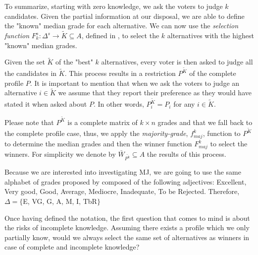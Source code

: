 \documentclass[version=3.21, pagesize, twoside=off, bibliography=totoc, DIV=calc, fontsize=12pt, a4paper]{scrartcl}
\begin{document}
To summarize, starting with zero knowledge, we ask the voters to judge $k$ candidates. Given the partial information at our disposal, we are able to define the "known" median grade for each alternative. We can now use the \emph{selection function} $F^s_k:\Delta^s \rightarrow \tilde{K} \subseteq A$, defined in , to select the $k$ alternatives with the highest "known" median grades.

Given the set $\tilde{K}$ of the "best" $k$ alternatives, every voter is then asked to judge all the candidates in $\tilde{K}$. 
This process results in a restriction $P^{\tilde{K}}$ of the complete profile $P$. It is important to mention that when we ask the voters to judge an alternative $i\in \tilde{K}$ we assume that they report their preference as they would have stated it when asked about $P$. In other words, $P^{\tilde{K}}_{i} = P_i$ for any $i \in \tilde{K}$.

Please note that $P^{\tilde{K}}$ is a complete matrix of $k \times n$ grades and that we fall back to the complete profile case, thus, we apply the \emph{majority-grade}, $f^k_{maj}$, function to $P^{\tilde{K}}$ to determine the median grades and then the winner function $F^k_{maj}$ to select the winners. For simplicity we denote by $\bar{W}_{\bar{P^k}} \subseteq A$ the results of this process.

\begin{remark}
	Because we are interested into investigating \acs{MJ}, we are going to use the same alphabet of grades proposed by \citet{Balinski2011} composed of the following adjectives: Excellent, Very good, Good, Average, Mediocre, Inadequate, To be Rejected. Therefore, $\Delta=\{$E, VG, G, A, M, I, TbR$\}$ 
\end{remark}

Once having defined the notation, the first question that comes to mind is about the risks of incomplete knowledge. Assuming there exists a profile which we only partially know, 
would we always select the same set of alternatives as winners in case of complete and incomplete knowledge?
\end{document}

